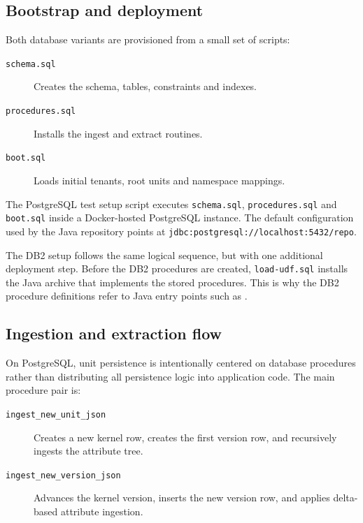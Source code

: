 \subsection{Bootstrap and deployment}

Both database variants are provisioned from a small set of scripts:
\begin{description}
\item[\texttt{schema.sql}] Creates the schema, tables, constraints and indexes.
\vspace{.2cm}
\item[\texttt{procedures.sql}] Installs the ingest and extract routines.
\vspace{.2cm}
\item[\texttt{boot.sql}] Loads initial tenants, root units and namespace mappings.
\end{description}

The PostgreSQL test setup script executes \texttt{schema.sql}, \texttt{procedures.sql} and \texttt{boot.sql} inside a Docker-hosted PostgreSQL instance. The default configuration used by the Java repository points at \texttt{jdbc:postgresql://localhost:5432/repo}.

The DB2 setup follows the same logical sequence, but with one additional deployment step. Before the DB2 procedures are created, \texttt{load-udf.sql} installs the Java archive that implements the stored procedures. This is why the DB2 procedure definitions refer to Java entry points such as .

\subsection{Ingestion and extraction flow}

On PostgreSQL, unit persistence is intentionally centered on database procedures rather than distributing all persistence logic into application code. The main procedure pair is:
\begin{description}
\item[\texttt{ingest\_new\_unit\_json}] Creates a new kernel row, creates the first version row, and recursively ingests the attribute tree.
\vspace{.2cm}
\item[\texttt{ingest\_new\_version\_json}] Advances the kernel version, inserts the new version row, and applies delta-based attribute ingestion.
\end{description}

